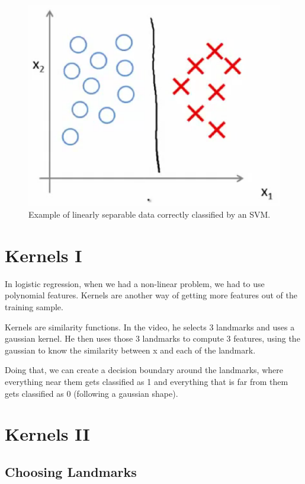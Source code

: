 \begin{figure}
\centering
\includegraphics[width=\textwidth]{img/large_margin.eps}
\caption{Example of linearly separable data correctly classified by an SVM.}
\label{fig:large_margin}
\end{figure}

\section{Kernels I}\label{kernels-i}

In logistic regression, when we had a non-linear problem, we had to use
polynomial features. Kernels are another way of getting more features
out of the training sample. \smallskip

Kernels are similarity functions. In the video, he selects 3 landmarks
and uses a gaussian kernel. He then uses those 3 landmarks to compute 3
features, using the gaussian to know the similarity between x and each
of the landmark.

Doing that, we can create a decision boundary around the landmarks,
where everything near them gets classified as 1 and everything that is
far from them gets classified as 0 (following a gaussian shape).

\section{Kernels II}\label{kernels-ii}

\subsection{Choosing Landmarks}\label{choosing-landmarks}

